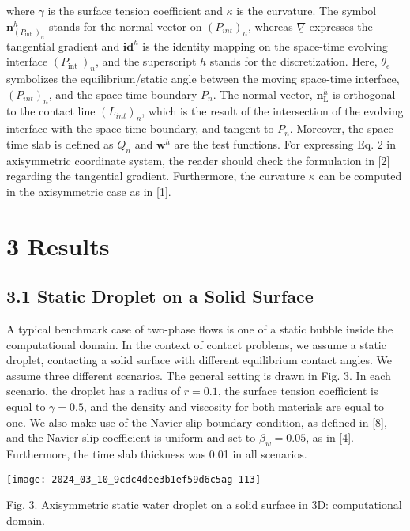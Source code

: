 \documentclass[10pt]{article}
\begin{document}
where $\gamma$ is the surface tension coefficient and $\kappa$ is the curvature. The symbol $\mathbf{n}_{\left(P_{\text {int }}\right)_{n}}^{h}$ stands for the normal vector on $\left(P_{i n t}\right)_{n}$, whereas $\underline{\nabla}$ expresses the tangential gradient and $\mathbf{i d}^{h}$ is the identity mapping on the space-time evolving interface $\left(P_{\text {int }}\right)_{n}$, and the superscript $h$ stands for the discretization. Here, $\theta_{e}$ symbolizes the equilibrium/static angle between the moving space-time interface, $\left(P_{i n t}\right)_{n}$, and the space-time boundary $P_{n}$. The normal vector, $\mathbf{n}_{\mathrm{L}}^{h}$ is orthogonal to the contact line $\left(L_{i n t}\right)_{n}$, which is the result of the intersection of the evolving interface with the space-time boundary, and tangent to $P_{n}$. Moreover, the space-time slab is defined as $Q_{n}$ and $\mathbf{w}^{h}$ are the test functions. For expressing Eq. 2 in axisymmetric coordinate system, the reader should check the formulation in [2] regarding the tangential gradient. Furthermore, the curvature $\kappa$ can be computed in the axisymmetric case as in [1].

\section*{3 Results}
\subsection*{3.1 Static Droplet on a Solid Surface}
A typical benchmark case of two-phase flows is one of a static bubble inside the computational domain. In the context of contact problems, we assume a static droplet, contacting a solid surface with different equilibrium contact angles. We assume three different scenarios. The general setting is drawn in Fig. 3. In each scenario, the droplet has a radius of $r=0.1$, the surface tension coefficient is equal to $\gamma=0.5$, and the density and viscosity for both materials are equal to one. We also make use of the Navier-slip boundary condition, as defined in [8], and the Navier-slip coefficient is uniform and set to $\beta_{w}=0.05$, as in [4]. Furthermore, the time slab thickness was 0.01 in all scenarios.

\begin{center}
\texttt{[image: 2024\_03\_10\_9cdc4dee3b1ef59d6c5ag-113]}
\end{center}

Fig. 3. Axisymmetric static water droplet on a solid surface in 3D: computational domain.
\end{document}
